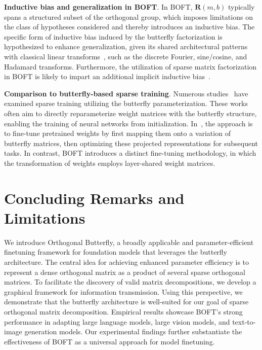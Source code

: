 \textbf{Inductive bias and generalization in BOFT}. In BOFT, $\bm{R}(m,b)$ typically spans a structured subset of the orthogonal group, which imposes limitations on the class of hypotheses considered and thereby introduces an inductive bias. The specific form of inductive bias induced by the butterfly factorization is hypothesized to enhance generalization, given its shared architectural patterns with classical linear transforms~\cite{dao2019kaleidoscope}, such as the discrete Fourier, sine/cosine, and Hadamard transforms. Furthermore, the utilization of sparse matrix factorization in BOFT is likely to impart an additional implicit inductive bias~\cite{gunasekar2017implicit,li2018algorithmic,liu2019neural}.

\textbf{Comparison to butterfly-based sparse training}. Numerous studies~\cite{dao2019learning,dao2019kaleidoscope,chen2022pixelated,dao2022monarch} have examined sparse training utilizing the butterfly parameterization. These works often aim to directly reparameterize weight matrices with the butterfly structure, enabling the training of neural networks from initialization. In~\cite{dao2022monarch}, the approach is to fine-tune pretrained weights by first mapping them onto a variation of butterfly matrices, then optimizing these projected representations for subsequent tasks. In contrast, BOFT introduces a distinct fine-tuning methodology, in which the transformation of weights employs layer-shared weight matrices.



\section{Concluding Remarks and Limitations}

We introduce Orthogonal Butterfly, a broadly applicable and parameter-efficient finetuning framework for foundation models that leverages the butterfly architecture. The central idea for achieving enhanced parameter efficiency is to represent a dense orthogonal matrix as a product of several sparse orthogonal matrices. To facilitate the discovery of valid matrix decompositions, we develop a graphical framework for information transmission. Using this perspective, we demonstrate that the butterfly architecture is well-suited for our goal of sparse orthogonal matrix decomposition. Empirical results showcase BOFT’s strong performance in adapting large language models, large vision models, and text-to-image generation models. Our experimental findings further substantiate the effectiveness of BOFT as a universal approach for model finetuning.

